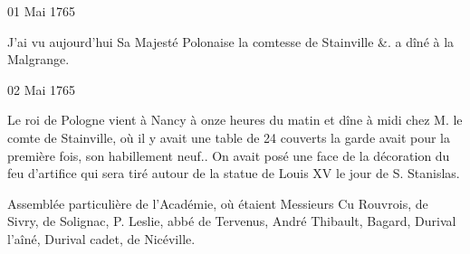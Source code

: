                      \begin{diary}{01 Mai 1765}{}

                         J'ai vu aujourd'hui Sa Majesté Polonaise
                           la comtesse
                              de Stainville \&. a dîné à la Malgrange. \bigskip


                     \end{diary}

                     \begin{diary}{02 Mai 1765}{}


                           Le roi de Pologne vient à Nancy à
                           onze heures
                           du matin et dîne à midi chez
                           M. le comte
                              de Stainville, où il y avait une table de
                           24 couverts la garde avait pour la première fois, son habillement neuf.. On avait posé une face
                           de la décoration du feu d'artifice qui sera
                           tiré autour de la statue de Louis XV le
                           jour de S. Stanislas. \bigskip


                         Assemblée particulière de l'Académie, où
                           étaient Messieurs
                           Cu Rouvrois, de Sivry, de
                              Solignac, P.
                           Leslie, abbé de Tervenus,
                              André
                           Thibault, Bagard, Durival
                              l'aîné, Durival
                              cadet, de
                              Nicéville. \bigskip




\end{diary}
